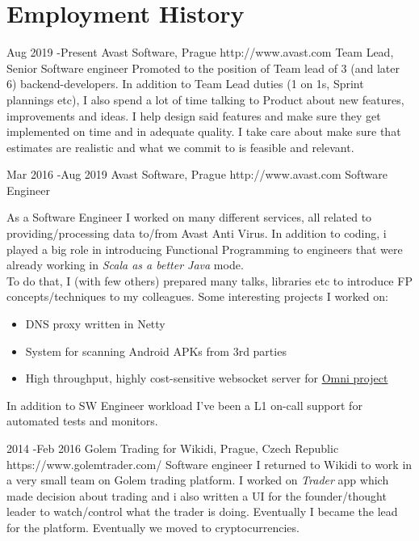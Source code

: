 \documentclass[10pt]{article} %
\begin{document}
\section{Employment History}

\job
{Aug 2019 -}{Present}
{Avast Software, Prague}
{http://www.avast.com}
{Team Lead, Senior Software engineer}
{Promoted to the position of Team lead of 3 (and later 6) backend-developers. In addition to Team Lead duties (1 on 1s, Sprint plannings etc), I also spend a lot of time
talking to Product about new features, improvements and ideas. I help design said features and make sure they get implemented on time and in adequate quality. I take care about make sure that
estimates are realistic and what we commit to is feasible and relevant. \\

}


\job
{Mar 2016 -}{Aug 2019}
{Avast Software, Prague}
{http://www.avast.com}
{Software Engineer}
{As a Software Engineer I worked on many different services, all related to providing/processing data to/from Avast Anti Virus. In addition to coding,
i played a big role in introducing Functional Programming to engineers that were already working in \emph{Scala as a better Java} mode. \\
To do that, I (with few others) prepared many talks, libraries etc to introduce FP concepts/techniques to my colleagues. Some interesting projects I worked on:
\begin{itemize}
    \item DNS proxy written in Netty
    \item System for scanning Android APKs from 3rd parties
    \item High throughput, highly cost-sensitive websocket server for \href{https://www.avast.com/en-us/omni}{Omni project}
\end{itemize}

In addition to SW Engineer workload I've been a L1 on-call support for automated tests and monitors.

}


\job
{2014 -}{Feb 2016}
{Golem Trading for Wikidi, Prague, Czech Republic}
{https://www.golemtrader.com/}
{Software engineer}
{I returned to Wikidi to work in a very small team on Golem trading platform. I worked on \emph{Trader} app which made decision about trading and i also written a UI for the founder/thought leader to watch/control what the trader is doing. Eventually I became the lead for the platform. Eventually we moved to cryptocurrencies.\\
}
\end{document}
